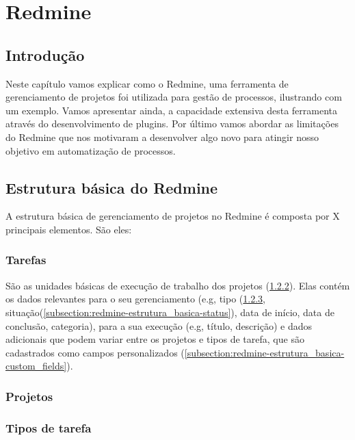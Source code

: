 \chapter{Redmine}\label{chp:redmine}

\section{Introdução}\label{sec:redmine-introducao}
Neste capítulo vamos explicar como o Redmine, uma ferramenta de gerenciamento de projetos foi utilizada para gestão de processos, ilustrando com um exemplo. Vamos apresentar ainda, a capacidade extensiva desta ferramenta através do desenvolvimento de plugins. Por último vamos abordar as limitações do Redmine que nos motivaram a desenvolver algo novo para atingir nosso objetivo em automatização de processos.

\section{Estrutura básica do Redmine}\label{sec:redmine-estrutura_basica}

A estrutura básica de gerenciamento de projetos no Redmine é composta por X principais elementos. São eles:

\subsection{Tarefas}\label{subsection:redmine-estrutura_basica-tarefa}

São as unidades básicas de execução de trabalho dos projetos (\ref{subsection:redmine-estrutura_basica-projeto}). Elas contém os dados relevantes para o seu gerenciamento (e.g, tipo (\ref{subsection:redmine-estrutura_basica-tracker}, situação(\ref{subsection:redmine-estrutura_basica-status}), data de início, data de conclusão, categoria), para a sua execução (e.g, título, descrição) e dados adicionais que podem variar entre os projetos e tipos de tarefa, que são cadastrados como campos personalizados (\ref{subsection:redmine-estrutura_basica-custom_fields}).  

\subsection{Projetos}\label{subsection:redmine-estrutura_basica-projeto}

\subsection{Tipos de tarefa}\label{subsection:redmine-estrutura_basica-tracker}


